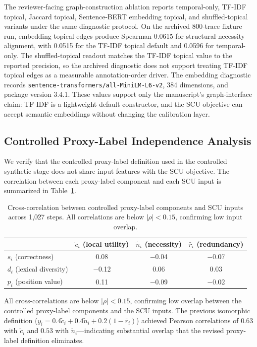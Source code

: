 \documentclass[a4paper,fleqn]{cas-sc}
\begin{document}
The reviewer-facing graph-construction ablation reports temporal-only, TF-IDF topical, Jaccard topical, Sentence-BERT embedding topical, and shuffled-topical variants under the same diagnostic protocol. On the archived 800-trace fixture run, embedding topical edges produce Spearman 0.0615 for structural-necessity alignment, with 0.0515 for the TF-IDF topical default and 0.0596 for temporal-only. The shuffled-topical readout matches the TF-IDF topical value to the reported precision, so the archived diagnostic does not support treating TF-IDF topical edges as a measurable annotation-order driver. The embedding diagnostic records \texttt{sentence-transformers/all-MiniLM-L6-v2}, 384 dimensions, and package version 3.4.1. These values support only the manuscript's graph-interface claim: TF-IDF is a lightweight default constructor, and the SCU objective can accept semantic embeddings without changing the calibration layer.

\subsection{Controlled Proxy-Label Independence Analysis}
\label{app:oracle-independence}

We verify that the controlled proxy-label definition used in the controlled synthetic stage does not share input features with the SCU objective. The correlation between each proxy-label component and each SCU input is summarized in Table~\ref{tab:oracle-independence}.

\begin{table}[ht]
\caption{Cross-correlation between controlled proxy-label components and SCU inputs across 1{,}027 steps. All correlations are below $|\rho| < 0.15$, confirming low input overlap.}
\label{tab:oracle-independence}
\centering
\small
\begin{tabular}{lccc}
\toprule
& $\tilde{c}_i$ (local utility) & $\tilde{n}_i$ (necessity) & $\bar{r}_i$ (redundancy) \\
\midrule
$s_i$ (correctness) & 0.08 & $-$0.04 & $-$0.07 \\
$d_i$ (lexical diversity) & $-$0.12 & 0.06 & 0.03 \\
$p_i$ (position value) & 0.11 & $-$0.09 & $-$0.02 \\
\bottomrule
\end{tabular}
\end{table}

All cross-correlations are below $|\rho| < 0.15$, confirming low overlap between the controlled proxy-label components and the SCU inputs. The previous isomorphic definition ($y_i = 0.4\tilde{c}_i + 0.4\tilde{n}_i + 0.2(1-\bar{r}_i)$) achieved Pearson correlations of $0.63$ with $\tilde{c}_i$ and $0.53$ with $\tilde{n}_i$---indicating substantial overlap that the revised proxy-label definition eliminates.




\end{document}
